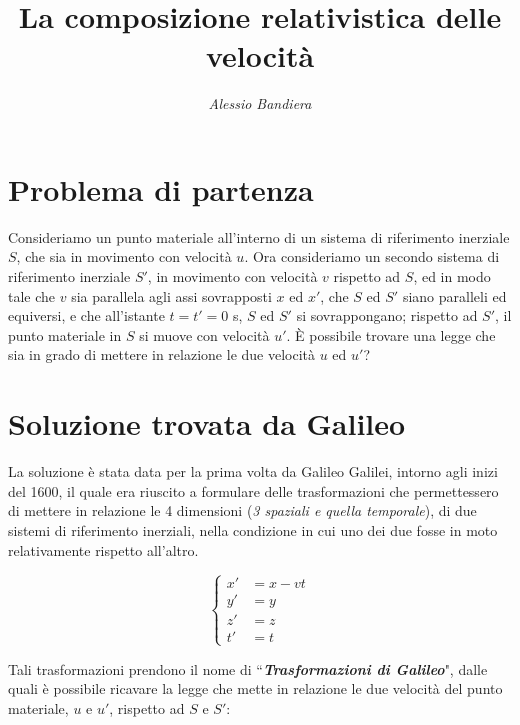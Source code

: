 \documentclass{article}
\begin{document}
\title{\textbf{La composizione relativistica delle velocità}}
\author{\textit{Alessio Bandiera}}
\date{} %

\maketitle

\section{Problema di partenza}
\null\par
Consideriamo un punto materiale all'interno di un sistema
di riferimento inerziale \(S\), che sia in movimento con
velocità \(u\). Ora consideriamo un secondo sistema di
riferimento inerziale \(S'\), in movimento con velocità
\(v\) rispetto ad \(S\), ed in modo tale che  \(v\) sia parallela
agli assi sovrapposti \(x\) ed \(x'\), che \(S\) ed \(S'\) siano
paralleli ed equiversi, e che all'istante \(t=t'=0\) s, \(S\)
ed \(S'\) si sovrappongano; rispetto ad \(S'\), il punto
materiale in \(S\) si muove con velocità \(u'\). \`E possibile
trovare una legge che sia in grado di mettere in relazione
le due velocità \(u\) ed \(u'\)?

\section{Soluzione trovata da Galileo}
La soluzione è stata data per la prima volta da Galileo Galilei,
intorno agli inizi del 1600, il quale era riuscito a formulare
delle trasformazioni che permettessero di mettere in relazione
le 4 dimensioni (\textit{3 spaziali e quella temporale}), di due
sistemi di riferimento inerziali, nella condizione in cui uno
dei due fosse in moto relativamente rispetto all'altro.

\begin{equation}
    \left\{
        \begin{aligned}
        x' &= x - vt \\
        y' &= y \\
        z' &= z \\
        t' &= t
        \end{aligned}
    \right.
\end{equation}

Tali
trasformazioni prendono il nome di ``\textbf{\textit{Trasformazioni di Galileo}}",
dalle quali è possibile ricavare la legge che mette in relazione
le due velocità del punto materiale, \(u\) e \(u'\), rispetto
ad \(S\) e \(S'\):
\end{document}
